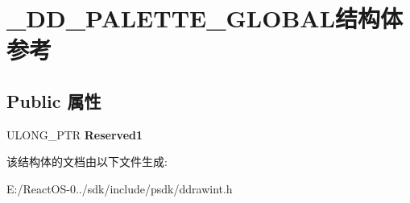 \hypertarget{struct___d_d___p_a_l_e_t_t_e___g_l_o_b_a_l}{}\section{\+\_\+\+D\+D\+\_\+\+P\+A\+L\+E\+T\+T\+E\+\_\+\+G\+L\+O\+B\+A\+L结构体 参考}
\label{struct___d_d___p_a_l_e_t_t_e___g_l_o_b_a_l}
\subsection*{Public 属性}
\begin{DoxyCompactItemize}
\item 
\mbox{\label{struct___d_d___p_a_l_e_t_t_e___g_l_o_b_a_l_af31b7d8659ac3f524156234e400292fb}} 
U\+L\+O\+N\+G\+\_\+\+P\+TR {\bfseries Reserved1}
\end{DoxyCompactItemize}


该结构体的文档由以下文件生成\+:\begin{DoxyCompactItemize}
\item 
E\+:/\+React\+O\+S-\/0../sdk/include/psdk/ddrawint.\+h\end{DoxyCompactItemize}

